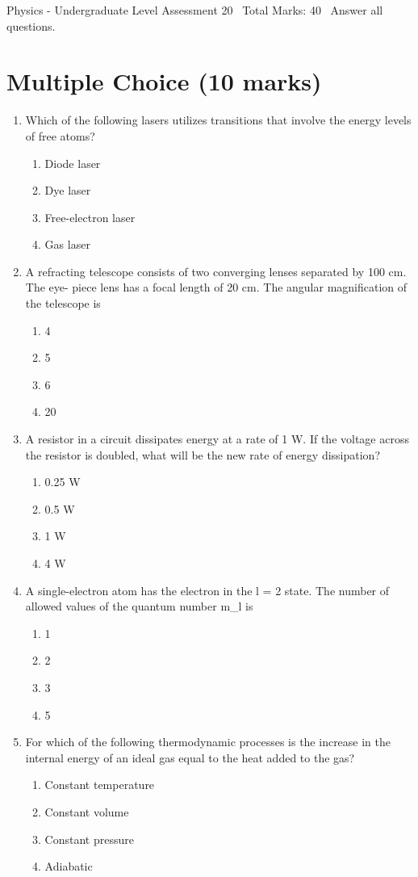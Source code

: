 \documentclass[12pt]{article}
\begin{document}
\begin{center}
Physics - Undergraduate Level Assessment 20 \
Total Marks: 40 \
Answer all questions.
\end{center}

\section*{Multiple Choice (10 marks)}
\begin{enumerate}[label=\arabic*.]
\item Which of the following lasers utilizes transitions that involve the energy levels of free atoms?
\begin{enumerate}[label=(\alph*)]
    \item Diode laser
    \item Dye laser
    \item Free-electron laser
    \item Gas laser
\end{enumerate}
\item A refracting telescope consists of two converging lenses separated by 100 cm. The eye- piece lens has a focal length of 20 cm. The angular magnification of the telescope is
\begin{enumerate}[label=(\alph*)]
    \item 4
    \item 5
    \item 6
    \item 20
\end{enumerate}
\item A resistor in a circuit dissipates energy at a rate of 1 W. If the voltage across the resistor is doubled, what will be the new rate of energy dissipation?
\begin{enumerate}[label=(\alph*)]
    \item 0.25 W
    \item 0.5 W
    \item 1 W
    \item 4 W
\end{enumerate}
\item A single-electron atom has the electron in the l = 2 state. The number of allowed values of the quantum number m\_l is
\begin{enumerate}[label=(\alph*)]
    \item 1
    \item 2
    \item 3
    \item 5
\end{enumerate}
\item For which of the following thermodynamic processes is the increase in the internal energy of an ideal gas equal to the heat added to the gas?
\begin{enumerate}[label=(\alph*)]
    \item Constant temperature
    \item Constant volume
    \item Constant pressure
    \item Adiabatic
\end{enumerate}
\end{enumerate}
\end{document}
